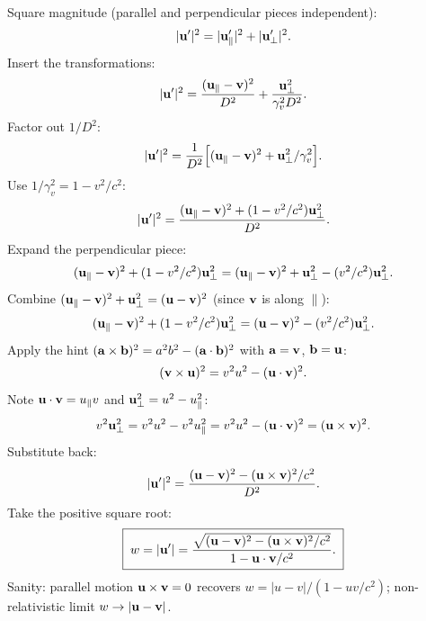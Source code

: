 \documentclass[11pt]{article}
\begin{document}
Square magnitude (parallel and perpendicular pieces independent):
\[ |\vb u'|^2 = |\vb u'_\parallel|^2 + |\vb u'_\perp|^2. \]
Insert the transformations:
\[ |\vb u'|^2 = \frac{(\vb u_\parallel-\vb v)^2}{D^2} + \frac{\vb u_\perp^2}{\gamma_v^2 D^2}. \]
Factor out $1/D^2$:
\[ |\vb u'|^2 = \frac{1}{D^2}\Bigl[(\vb u_\parallel-\vb v)^2 + \vb u_\perp^2/\gamma_v^2\Bigr]. \]
Use $1/\gamma_v^2 = 1-v^2/c^2$:
\[ |\vb u'|^2 = \frac{(\vb u_\parallel-\vb v)^2 + (1-v^2/c^2)\vb u_\perp^2}{D^2}. \]
Expand the perpendicular piece:
\[ (\vb u_\parallel-\vb v)^2 + (1-v^2/c^2)\vb u_\perp^2 = (\vb u_\parallel-\vb v)^2 + \vb u_\perp^2 - (v^2/c^2)\vb u_\perp^2. \]
Combine $(\vb u_\parallel-\vb v)^2 + \vb u_\perp^2 = (\vb u-\vb v)^2$ (since $\vb v$ is along $\hat\parallel$):
\[ (\vb u_\parallel-\vb v)^2 + (1-v^2/c^2)\vb u_\perp^2 = (\vb u-\vb v)^2 - (v^2/c^2)\vb u_\perp^2. \]
Apply the hint $(\vb a\times\vb b)^2 = a^2 b^2 - (\vb a\cdot\vb b)^2$ with $\vb a=\vb v$, $\vb b=\vb u$:
\[ (\vb v\times\vb u)^2 = v^2 u^2 - (\vb u\cdot\vb v)^2. \]
Note $\vb u\cdot\vb v = u_\parallel v$ and $\vb u_\perp^2 = u^2 - u_\parallel^2$:
\[ v^2\vb u_\perp^2 = v^2 u^2 - v^2 u_\parallel^2 = v^2 u^2 - (\vb u\cdot\vb v)^2 = (\vb u\times\vb v)^2. \]
Substitute back:
\[ |\vb u'|^2 = \frac{(\vb u-\vb v)^2 - (\vb u\times\vb v)^2/c^2}{D^2}. \]
Take the positive square root:
\[ \boxed{\;w = |\vb u'| = \frac{\sqrt{(\vb u-\vb v)^2 - (\vb u\times\vb v)^2/c^2}}{1-\vb u\cdot\vb v/c^2}.\;} \]
Sanity: parallel motion $\vb u\times\vb v=0$ recovers $w=|u-v|/(1-uv/c^2)$; non-relativistic limit $w\to|\vb u-\vb v|$.
\end{document}
